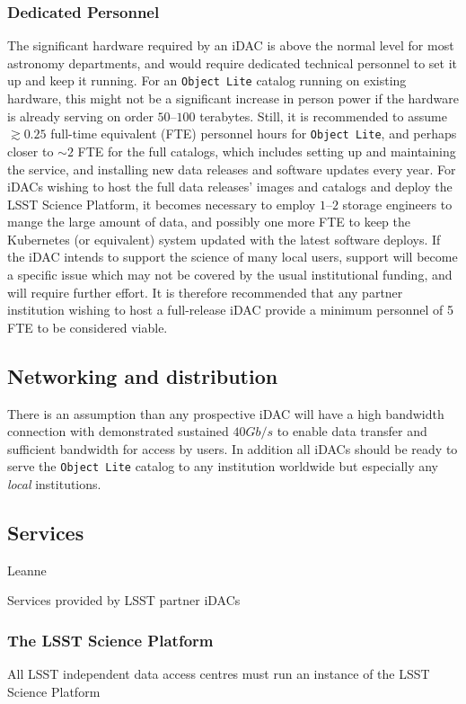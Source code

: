 \subsubsection{Dedicated Personnel}
The significant hardware required by an iDAC is above the normal level for most astronomy departments, and would require dedicated technical personnel to set it up and keep it running. For an {\tt Object Lite} catalog running on existing hardware, this might not be a significant increase in person power if the hardware is already serving on order $50$--$100$ terabytes. Still, it is recommended to assume $\gtrsim0.25$ full-time equivalent (FTE) personnel hours for {\tt Object Lite}, and perhaps closer to $\sim2$ FTE for the full catalogs, which includes setting up and maintaining the service, and installing new data releases and software updates every year. For iDACs wishing to host the full data releases' images and catalogs and deploy the LSST Science Platform, it becomes necessary to employ $1$--$2$ storage engineers to mange the large amount of data, and possibly one more FTE to keep the Kubernetes (or equivalent) system updated with the latest software deploys. If the iDAC intends to support the science of many local users, support will become a specific issue which may not be covered by the usual institutional funding, and will require further effort. It is therefore recommended that any partner institution wishing to host a full-release iDAC provide a minimum personnel of 5 FTE to be considered viable.

\subsection{Networking and distribution}
There is an assumption than any prospective iDAC will have a high bandwidth connection with demonstrated sustained $40 Gb/s$ to enable data transfer and sufficient bandwidth for access by users.
In addition all iDACs should be ready  to serve the {\tt Object Lite} catalog to any institution worldwide but especially any {\em local} institutions.

\subsection{Services}
{\color{red} Leanne } \newline

Services provided by LSST partner iDACs

\subsubsection{The LSST Science Platform}
All LSST independent data access centres must run an instance of the LSST Science Platform

